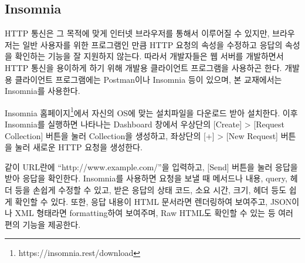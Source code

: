 \subsection*{Insomnia}

HTTP 통신은 그 목적에 맞게 인터넷 브라우저를 통해서 이루어질 수 있지만, 브라우저는 일반 사용자를 위한 프로그램인 만큼 HTTP 요청의 속성을 수정하고 응답의 속성을 확인하는 기능을 잘 지원하지 않는다. 따라서 개발자들은 웹 서버를 개발하면서 HTTP 통신을 용이하게 하기 위해 개발용 클라이언트 프로그램을 사용하곤 한다. 개발용 클라이언트 프로그램에는 Postman이나 Insomnia 등이 있으며, 본 교재에서는 Insomnia를 사용한다.

Insomnia 홈페이지\footnote{https://insomnia.rest/download}에서 자신의 OS에 맞는 설치파일을 다운로드 받아 설치한다. 이후 Insomnia를 실행하면 나타나는 Dashboard 창에서 우상단의 [Create] \textgreater{} [Request Collection] 버튼을 눌러 Collection을 생성하고, 좌상단의 [+] \textgreater{} [New Request] 버튼을 눌러 새로운 HTTP 요청을 생성한다.

    {}

\와 같이 URL란에 ``http://www.example.com/''을 입력하고, [Send] 버튼을 눌러 응답을 받아 응답을 확인한다. Insomnia를 사용하면 요청을 보낼 때 메서드나 내용, query, 헤더 등을 손쉽게 수정할 수 있고, 받은 응답의 상태 코드, 소요 시간, 크기, 헤더 등도 쉽게 확인할 수 있다. 또한, 응답 내용이 HTML 문서라면 렌더링하여 보여주고, JSON이나 XML 형태라면 formatting하여 보여주며, Raw HTML도 확인할 수 있는 등 여러 편의 기능을 제공한다.
